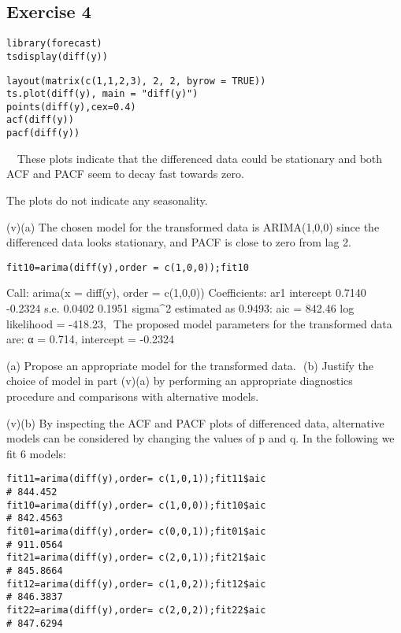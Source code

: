 \documentclass[a4paper,12pt]{article}
\begin{document}
\newpage 
\subsection*{Exercise 4}


\begin{framed}
\begin{verbatim}
library(forecast)
tsdisplay(diff(y))  
\end{verbatim}
\end{framed}

\begin{framed}
\begin{verbatim}
layout(matrix(c(1,1,2,3), 2, 2, byrow = TRUE))
ts.plot(diff(y), main = "diff(y)")
points(diff(y),cex=0.4)
acf(diff(y))
pacf(diff(y))
\end{verbatim}
\end{framed}


​
​
​
These plots indicate that the differenced data could be stationary and both ACF and
PACF seem to decay fast towards zero.
​
​
 
The plots do not indicate any seasonality.

(v)(a)
The chosen model for the transformed data is ARIMA(1,0,0) since the differenced
data looks stationary, and PACF is close to zero from lag 2.
​

\begin{framed}
\begin{verbatim}
fit10=arima(diff(y),order = c(1,0,0));fit10
\end{verbatim}
\end{framed}

Call:
arima(x = diff(y), order = c(1,0,0))
Coefficients:
ar1 intercept
0.7140
-0.2324
s.e. 0.0402
0.1951
sigma^2 estimated as 0.9493:
aic = 842.46
log likelihood = -418.23,
​
The proposed model parameters for the transformed data are:
α = 0.714, intercept = -0.2324


\newpage 
(a) Propose an appropriate model for the transformed data.
​
(b) Justify the choice of model in part (v)(a) by performing an appropriate
diagnostics procedure and comparisons with alternative models.



(v)(b)
By inspecting the ACF and PACF plots of differenced data, alternative models can be
considered by changing the values of p and q. In the following we fit 6 models:
​

\begin{framed}
\begin{verbatim}
fit11=arima(diff(y),order= c(1,0,1));fit11$aic
# 844.452
fit10=arima(diff(y),order= c(1,0,0));fit10$aic
# 842.4563
fit01=arima(diff(y),order= c(0,0,1));fit01$aic
# 911.0564
fit21=arima(diff(y),order= c(2,0,1));fit21$aic
# 845.8664
fit12=arima(diff(y),order= c(1,0,2));fit12$aic
# 846.3837
fit22=arima(diff(y),order= c(2,0,2));fit22$aic
# 847.6294
\end{verbatim}
\end{framed}
\end{document}
